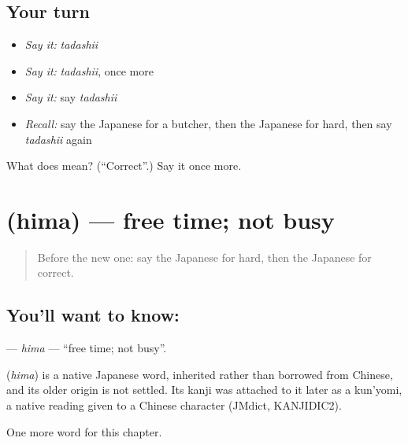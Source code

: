 \subsection*{Your turn}
\begin{itemize}
\raggedright
  \item \emph{Say it:} \emph{tadashii}
  \item \emph{Say it:} \emph{tadashii}, once more
  \item \emph{Say it:} say \emph{tadashii}
  \item \emph{Recall:} say the Japanese for a butcher, then the Japanese for hard, then say \emph{tadashii} again
\end{itemize}

\begin{tcolorbox}[breakable,colback=teal!4,colframe=teal!35!black,title={Before you move on}]
What does  mean? (\textquotedblleft{}Correct\textquotedblright{}.) Say it once more.
\end{tcolorbox}
\section[\texorpdfstring{\ja{ひま} (hima)}{ひま (hima)}]{ (hima) — free time; not busy}

\label{lesson:JA-C120-hima}



\begin{quote}
Before the new one: say the Japanese for hard, then the Japanese for correct.
\end{quote}

\subsection*{You'll want to know: }
\textbf{} — \emph{hima} — \textquotedblleft{}free time; not busy\textquotedblright{}.

\begin{cousinweb}
\textbf{} (\emph{hima}) is a native Japanese word, inherited rather than borrowed from Chinese, and its older origin is not settled. Its kanji was attached to it later as a kun'yomi, a native reading given to a Chinese character (JMdict, KANJIDIC2).
\end{cousinweb}

\begin{grammarlens}[title={What you've built}]
One more word for this chapter.
\end{grammarlens}

